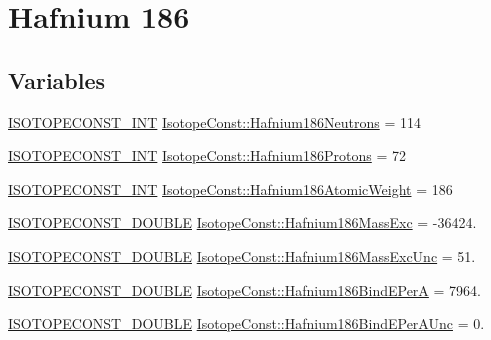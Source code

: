\hypertarget{group___isotope_const-_hafnium-_hf186}{}\section{Hafnium 186}
\label{group___isotope_const-_hafnium-_hf186}
\subsection*{Variables}
\begin{DoxyCompactItemize}
\item 
\mbox{\hyperlink{group___isotope_const-_macros_ga5f18360b3e99483a35c32d789e62621c}{I\+S\+O\+T\+O\+P\+E\+C\+O\+N\+S\+T\+\_\+\+I\+NT}} \mbox{\hyperlink{group___isotope_const-_hafnium-_hf186_ga08de4b3f95809b67fc9a35058d02888a}{Isotope\+Const\+::\+Hafnium186\+Neutrons}} = 114
\item 
\mbox{\hyperlink{group___isotope_const-_macros_ga5f18360b3e99483a35c32d789e62621c}{I\+S\+O\+T\+O\+P\+E\+C\+O\+N\+S\+T\+\_\+\+I\+NT}} \mbox{\hyperlink{group___isotope_const-_hafnium-_hf186_ga8e626123ab1cac79d1eeab907c3693f7}{Isotope\+Const\+::\+Hafnium186\+Protons}} = 72
\item 
\mbox{\hyperlink{group___isotope_const-_macros_ga5f18360b3e99483a35c32d789e62621c}{I\+S\+O\+T\+O\+P\+E\+C\+O\+N\+S\+T\+\_\+\+I\+NT}} \mbox{\hyperlink{group___isotope_const-_hafnium-_hf186_gaedb632e87fbcae395dd018905f988eb3}{Isotope\+Const\+::\+Hafnium186\+Atomic\+Weight}} = 186
\item 
\mbox{\hyperlink{group___isotope_const-_macros_ga8f45a7272ce02c0b4c65c44636ed719a}{I\+S\+O\+T\+O\+P\+E\+C\+O\+N\+S\+T\+\_\+\+D\+O\+U\+B\+LE}} \mbox{\hyperlink{group___isotope_const-_hafnium-_hf186_ga4c99e82df86530412f126ce981fc8a4b}{Isotope\+Const\+::\+Hafnium186\+Mass\+Exc}} = -\/36424.
\item 
\mbox{\hyperlink{group___isotope_const-_macros_ga8f45a7272ce02c0b4c65c44636ed719a}{I\+S\+O\+T\+O\+P\+E\+C\+O\+N\+S\+T\+\_\+\+D\+O\+U\+B\+LE}} \mbox{\hyperlink{group___isotope_const-_hafnium-_hf186_gac3b5f85fcc136638dfdcbd44229a33a6}{Isotope\+Const\+::\+Hafnium186\+Mass\+Exc\+Unc}} = 51.
\item 
\mbox{\hyperlink{group___isotope_const-_macros_ga8f45a7272ce02c0b4c65c44636ed719a}{I\+S\+O\+T\+O\+P\+E\+C\+O\+N\+S\+T\+\_\+\+D\+O\+U\+B\+LE}} \mbox{\hyperlink{group___isotope_const-_hafnium-_hf186_gaca51f4c2b58d3e5e9d61f49c64591ff0}{Isotope\+Const\+::\+Hafnium186\+Bind\+E\+PerA}} = 7964.
\item 
\mbox{\hyperlink{group___isotope_const-_macros_ga8f45a7272ce02c0b4c65c44636ed719a}{I\+S\+O\+T\+O\+P\+E\+C\+O\+N\+S\+T\+\_\+\+D\+O\+U\+B\+LE}} \mbox{\hyperlink{group___isotope_const-_hafnium-_hf186_ga5429707837ba3b0e5b001adb162f55b6}{Isotope\+Const\+::\+Hafnium186\+Bind\+E\+Per\+A\+Unc}} = 0.

\end{DoxyCompactItemize}

